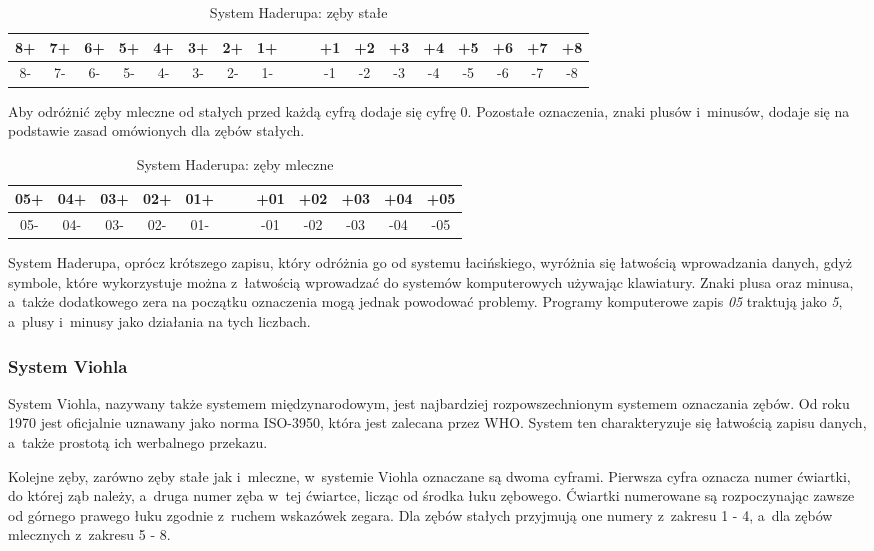 \begin{table}[h t]
\centering
\begin{tabular}{c c c c c c c c c | c c c c c c c c c}
8+ & 7+ & 6+ & 5+ & 4+ & 3+ & 2+ & 1+ &&& +1 & +2 & +3 & +4 & +5 & +6 & +7 & +8
\\ [1ex] \hline \rule{0pt}{1.2\normalbaselineskip}
8- & 7- & 6- & 5- & 4- & 3- & 2- & 1- &&& -1 & -2 & -3 & -4 & -5 & -6 & -7 & -8
\end{tabular}
\caption{\label{tab:tab5} System Haderupa: zęby stałe}
\end{table}

Aby odróżnić zęby mleczne od stałych przed każdą cyfrą dodaje się cyfrę 0. Pozostałe oznaczenia, znaki plusów i~minusów, dodaje się na podstawie zasad omówionych dla zębów stałych.\\

\begin{table}[h t]
\centering
\begin{tabular}{c c c c c c | c c c c c c}
05+ & 04+ & 03+ & 02+ & 01+ &&& +01 & +02 & +03 & +04 & +05 \\
[1ex] \hline \rule{0pt}{1.2\normalbaselineskip}
05- & 04- & 03- & 02- & 01- &&& -01 & -02 & -03 & -04 & -05
\end{tabular}
\caption{\label{tab:tab6} System Haderupa: zęby mleczne}
\end{table}

System Haderupa, oprócz krótszego zapisu, który odróżnia go od systemu łacińskiego, wyróżnia się łatwością wprowadzania danych, gdyż symbole, które wykorzystuje można z~łatwością wprowadzać do systemów komputerowych używając klawiatury. Znaki plusa oraz minusa, a~także dodatkowego zera na początku oznaczenia mogą jednak powodować problemy. Programy komputerowe zapis \textit{05} traktują jako \textit{5}, a~plusy i~minusy jako działania na tych liczbach.

\subsubsection{System Viohla}

System Viohla, nazywany także systemem międzynarodowym, jest najbardziej rozpowszechnionym systemem oznaczania zębów. Od roku 1970 jest oficjalnie uznawany jako norma ISO-3950, która jest zalecana przez WHO. System ten charakteryzuje się łatwością zapisu danych, a~także prostotą ich werbalnego przekazu.

Kolejne zęby, zarówno zęby stałe jak i~mleczne, w~systemie Viohla oznaczane są dwoma cyframi. Pierwsza cyfra oznacza numer ćwiartki, do której ząb należy, a~druga numer zęba w~tej ćwiartce, licząc od środka łuku zębowego. Ćwiartki numerowane są rozpoczynając zawsze od górnego prawego łuku zgodnie z~ruchem wskazówek zegara. Dla zębów stałych przyjmują one numery z~zakresu 1 - 4, a~dla zębów mlecznych z~zakresu 5 - 8.\\

